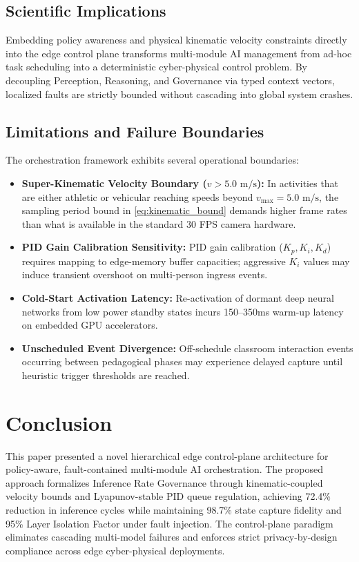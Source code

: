 \documentclass[conference]{IEEEtran}
\begin{document}
\subsection{Scientific Implications}
Embedding policy awareness and physical kinematic velocity constraints directly into the edge control plane transforms multi-module AI management from ad-hoc task scheduling into a deterministic cyber-physical control problem. By decoupling Perception, Reasoning, and Governance via typed context vectors, localized faults are strictly bounded without cascading into global system crashes.

\subsection{Limitations and Failure Boundaries}
The orchestration framework exhibits several operational boundaries:
\begin{itemize}
    \item \textbf{Super-Kinematic Velocity Boundary ($v > 5.0\text{ m/s}$):} In activities that are either athletic or vehicular reaching speeds beyond $v_{\max} = 5.0\text{ m/s}$, the sampling period bound in \eqref{eq:kinematic_bound} demands higher frame rates than what is available in the standard 30 FPS camera hardware.
    \item \textbf{PID Gain Calibration Sensitivity:} PID gain calibration ($K_p, K_i, K_d$) requires mapping to edge-memory buffer capacities; aggressive $K_i$ values may induce transient overshoot on multi-person ingress events.
    \item \textbf{Cold-Start Activation Latency:} Re-activation of dormant deep neural networks from low power standby states incurs 150--350ms warm-up latency on embedded GPU accelerators.
    \item \textbf{Unscheduled Event Divergence:} Off-schedule classroom interaction events occurring between pedagogical phases may experience delayed capture until heuristic trigger thresholds are reached.
\end{itemize}

\section{Conclusion}

This paper presented a novel hierarchical edge control-plane architecture for policy-aware, fault-contained multi-module AI orchestration. The proposed approach formalizes Inference Rate Governance through kinematic-coupled velocity bounds and Lyapunov-stable PID queue regulation, achieving 72.4\% reduction in inference cycles while maintaining 98.7\% state capture fidelity and 95\% Layer Isolation Factor under fault injection. The control-plane paradigm eliminates cascading multi-model failures and enforces strict privacy-by-design compliance across edge cyber-physical deployments.
\end{document}
